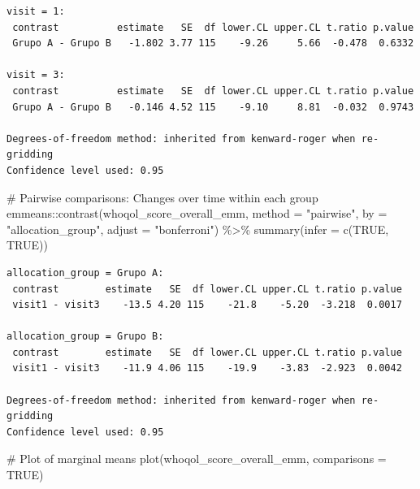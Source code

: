 \documentclass[
  letterpaper,
  DIV=11,
  numbers=noendperiod]{scrartcl}
\newenvironment{Shaded}{\begin{snugshade}}{\end{snugshade}}
\newcommand{\AttributeTok}[1]{\textcolor[rgb]{0.40,0.45,0.13}{#1}}
\newcommand{\CommentTok}[1]{\textcolor[rgb]{0.37,0.37,0.37}{#1}}
\newcommand{\ConstantTok}[1]{\textcolor[rgb]{0.56,0.35,0.01}{#1}}
\newcommand{\FunctionTok}[1]{\textcolor[rgb]{0.28,0.35,0.67}{#1}}
\newcommand{\NormalTok}[1]{\textcolor[rgb]{0.00,0.23,0.31}{#1}}
\newcommand{\SpecialCharTok}[1]{\textcolor[rgb]{0.37,0.37,0.37}{#1}}
\newcommand{\StringTok}[1]{\textcolor[rgb]{0.13,0.47,0.30}{#1}}
\begin{document}
\begin{verbatim}
visit = 1:
 contrast          estimate   SE  df lower.CL upper.CL t.ratio p.value
 Grupo A - Grupo B   -1.802 3.77 115    -9.26     5.66  -0.478  0.6332

visit = 3:
 contrast          estimate   SE  df lower.CL upper.CL t.ratio p.value
 Grupo A - Grupo B   -0.146 4.52 115    -9.10     8.81  -0.032  0.9743

Degrees-of-freedom method: inherited from kenward-roger when re-gridding 
Confidence level used: 0.95 
\end{verbatim}

\begin{Shaded}
\begin{Highlighting}[]
\CommentTok{\# Pairwise comparisons: Changes over time within each group}
\NormalTok{emmeans}\SpecialCharTok{::}\FunctionTok{contrast}\NormalTok{(whoqol\_score\_overall\_emm, }\AttributeTok{method =} \StringTok{"pairwise"}\NormalTok{, }\AttributeTok{by =} \StringTok{"allocation\_group"}\NormalTok{, }\AttributeTok{adjust =} \StringTok{"bonferroni"}\NormalTok{) }\SpecialCharTok{\%\textgreater{}\%} \FunctionTok{summary}\NormalTok{(}\AttributeTok{infer =} \FunctionTok{c}\NormalTok{(}\ConstantTok{TRUE}\NormalTok{, }\ConstantTok{TRUE}\NormalTok{))}
\end{Highlighting}
\end{Shaded}

\begin{verbatim}
allocation_group = Grupo A:
 contrast        estimate   SE  df lower.CL upper.CL t.ratio p.value
 visit1 - visit3    -13.5 4.20 115    -21.8    -5.20  -3.218  0.0017

allocation_group = Grupo B:
 contrast        estimate   SE  df lower.CL upper.CL t.ratio p.value
 visit1 - visit3    -11.9 4.06 115    -19.9    -3.83  -2.923  0.0042

Degrees-of-freedom method: inherited from kenward-roger when re-gridding 
Confidence level used: 0.95 
\end{verbatim}

\begin{Shaded}
\begin{Highlighting}[]
\CommentTok{\# Plot of marginal means}
\FunctionTok{plot}\NormalTok{(whoqol\_score\_overall\_emm, }\AttributeTok{comparisons =} \ConstantTok{TRUE}\NormalTok{)}
\end{Highlighting}
\end{Shaded}
\end{document}

